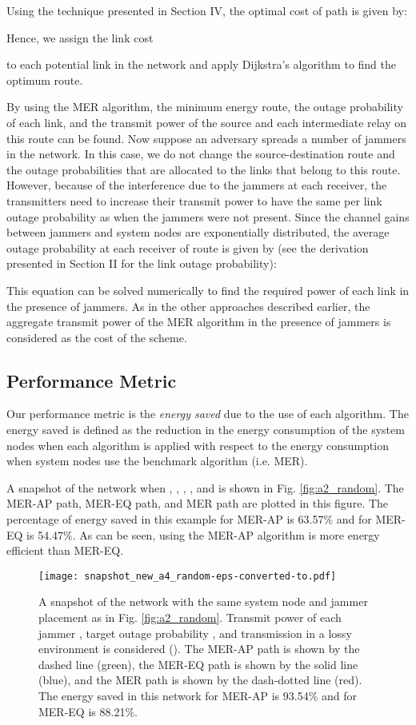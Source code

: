 \documentclass[10pt,journal]{IEEEtran}
\theoremstyle{definition}
\begin{document}
Using the technique presented in Section IV, the optimal cost of path  is given by: 

Hence, we assign the link cost

to each potential link  in the network and apply    Dijkstra's algorithm to find the optimum route.  

By using the
MER algorithm, the minimum energy route, the
outage probability of each link, and the transmit power of the source and each intermediate
relay on this route can be found. Now suppose an adversary spreads a number of jammers
in the network. In this case, we do not change the source-destination route and the outage
probabilities that are allocated to the links that belong to this route. However, because of
the interference due to the jammers at each receiver, the transmitters need to increase their
transmit power to have the same per link outage probability as when the jammers were
not present.
Since the channel gains between jammers and system nodes are  exponentially distributed, the average outage probability at each receiver of route  is given by (see the derivation presented in Section II for the link outage probability):

This equation can be solved numerically to find the required power of each link  in the presence of  jammers.
As in the other approaches described earlier, the aggregate transmit power of the MER algorithm in the presence of jammers is considered as the cost of the scheme.
\subsection{Performance Metric}
Our performance metric is the \textit{energy saved} due to the use of  each algorithm. The  energy saved is defined as  the reduction in the  energy consumption of the system nodes when each algorithm is applied with respect to the  energy consumption when system nodes use the benchmark algorithm (i.e. MER). 

A snapshot of the network  when , , , , and  is shown in Fig. \ref{fig:a2_random}. The MER-AP path, MER-EQ path, and MER path are plotted in this figure. 
The percentage of energy saved in this example for  MER-AP is 63.57\% and for  MER-EQ  is 54.47\%.
As can be seen, using the MER-AP algorithm is more energy efficient than MER-EQ.

\begin{figure}
\begin{center}
 \texttt{[image: snapshot\_new\_a4\_random-eps-converted-to.pdf]}
 \end{center}
\caption{A snapshot of the network with the same system node and jammer placement as in Fig. \ref{fig:a2_random}. Transmit power of each jammer , target outage probability , and transmission in a lossy environment is considered (). The  MER-AP path  is shown by the dashed line (green), the  MER-EQ path is shown by the solid line (blue), and the MER path is shown by the dash-dotted line (red). The  energy saved in this network for MER-AP  is 93.54\% and for MER-EQ  is 88.21\%.}
 \label{fig:a4_random}
 \end{figure} 
\end{document}

